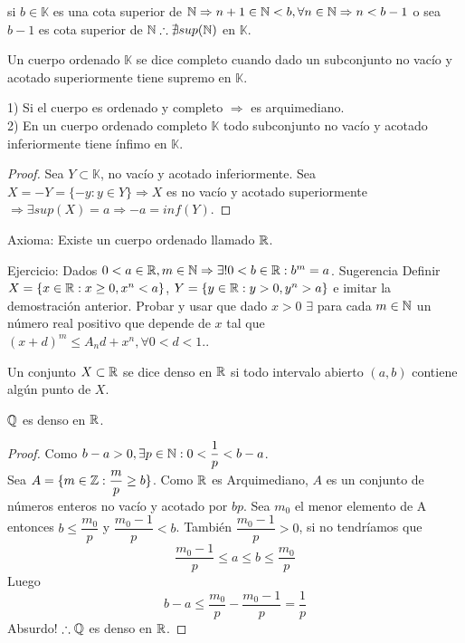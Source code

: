 si $b \in \mathbb{K}$ es una cota superior de $\mathbb{N} \Rightarrow n+1 \in \mathbb{N}<b, \forall n \in \mathbb{N} \Rightarrow n < b-1$ o sea $b-1$ es cota superior de $\mathbb{N} \therefore \nexists sup(\mathbb{N})$ en $\mathbb{K}$.

\begin{definition}
    Un cuerpo ordenado $\mathbb{K}$ se dice completo cuando dado un subconjunto no vacío y acotado superiormente tiene supremo en $\mathbb{K}$.
\end{definition}

\begin{note}
    1) Si el cuerpo es ordenado y completo $\Rightarrow$ es arquimediano. \\
    2) En un cuerpo ordenado completo $\mathbb{K}$ todo subconjunto no vacío y acotado inferiormente tiene ínfimo en $\mathbb{K}$.
    \begin{proof}
        Sea $Y \subset \mathbb{K}$, no vacío y acotado inferiormente. Sea $X = -Y = \{ -y:y \in Y \} \Rightarrow X$ es no vacío y acotado superiormente $\Rightarrow \exists sup(X)=a \Rightarrow -a=inf(Y)$.
    \end{proof}
\end{note}

Axioma: Existe un cuerpo ordenado llamado $\mathbb{R}$.


Ejercicio: Dados $0<a \in \mathbb{R}, m \in \mathbb{N} \Rightarrow \exists! 0<b\in \mathbb{R} : b^m =a$. Sugerencia Definir $X = \{ x \in \mathbb{R} : x\geq0, x^n<a \}$, $Y = \{ y \in \mathbb{R} : y>0, y^n >a \}$ e imitar la demostración anterior. Probar y usar que dado $x>0$ $\exists$ para cada $m \in \mathbb{N}$ un número real positivo que depende de $x$ tal que $(x+d)^m \leq A_nd+x^n, \forall 0<d<1.$.

\begin{definition}
    Un conjunto $X \subset \mathbb{R}$ se dice denso en $\mathbb{R}$ si todo intervalo abierto $(a, b)$ contiene algún punto de $X$.
\end{definition}

\begin{eg}
    $\mathbb{Q}$ es denso en $\mathbb{R}$.
    \begin{proof}
        Como $b-a>0, \exists p\in \mathbb{N}: 0 < \dfrac{1}{p}<b-a$. \\
        Sea $A = \{ m \in \mathbb{Z}: \dfrac{m}{p} \geq b \}$. Como $\mathbb{R}$ es Arquimediano, $A$ es un conjunto de números enteros no vacío y acotado por $bp$. Sea $m_0$ el menor elemento de A entonces $b\leq \dfrac{m_0}{p}$ y $\dfrac{m_0-1}{p} <b$. También $\dfrac{m_0-1}{p} > 0$, si no tendríamos que
        \begin{equation}
            \dfrac{m_0-1}{p} \leq a \leq b \leq \dfrac{m_0}{p}
        \end{equation}
        Luego
        \begin{equation}
            b-a \leq \dfrac{m_0}{p} - \dfrac{m_0-1}{p} = \dfrac1p
        \end{equation}
        Absurdo! $\therefore \mathbb{Q}$ es denso en $\mathbb{R}$.
    \end{proof}
\end{eg}

